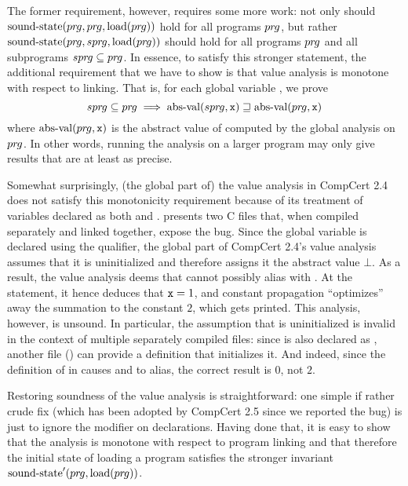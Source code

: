 

The former requirement, however, requires some more work:
not only should \\ $\mathrm{sound\text{-}state}({pr\hspace*{-1pt}g},{pr\hspace*{-1pt}g},\mathrm{load}({pr\hspace*{-1pt}g}))$ hold for all programs ${pr\hspace*{-1pt}g}$,
but rather \\ $\mathrm{sound\text{-}state}({pr\hspace*{-1pt}g},{spr\hspace*{-1pt}g},\mathrm{load}({pr\hspace*{-1pt}g}))$ should hold for all programs ${pr\hspace*{-1pt}g}$ and all subprograms ${spr\hspace*{-1pt}g}\subseteq{pr\hspace*{-1pt}g}$.
In essence, to satisfy this stronger statement, the additional requirement that we have to show is that value analysis is monotone with respect to linking.
That is, for each global variable , we prove
\[
{spr\hspace*{-1pt}g} \subseteq {pr\hspace*{-1pt}g} \implies  \mathrm{abs\text{-}val}({spr\hspace*{-1pt}g},\texttt{x}) \sqsupseteq \mathrm{abs\text{-}val}({pr\hspace*{-1pt}g},\texttt{x})
\]
where $\mathrm{abs\text{-}val}({pr\hspace*{-1pt}g},\texttt{x})$ is the abstract value of  computed by the global analysis on ${pr\hspace*{-1pt}g}$.
In other words, running the analysis on a larger program may only give results that are at least as precise.

Somewhat surprisingly, (the global part of) the value analysis in
CompCert 2.4 does not satisfy this monotonicity requirement because of
its treatment of variables declared as both  and
.   presents two C files that,
when compiled separately and linked together, expose the bug.  Since
the global variable  is declared using the 
qualifier, the global part of CompCert 2.4's value analysis assumes
that it is uninitialized and therefore assigns it the abstract value
$\bot$.  As a result, the value analysis deems that  cannot
possibly alias with .  At the  statement, it
hence deduces that $\texttt{x}=1$, and constant propagation
``optimizes'' away the summation  to the constant $2$, which
gets printed.  This analysis, however, is unsound.  In particular, the
assumption that  is uninitialized is invalid in the context
of multiple separately compiled files: since  is also
declared as , another file () can provide a
definition that initializes it.  And indeed, since the definition of
 in  causes  and  to alias, the
correct result is $0$, not $2$.

Restoring soundness of the value analysis is straightforward: one
simple if rather crude fix (which has been adopted by CompCert 2.5
since we reported the bug) is just to ignore the  modifier
on  declarations.  Having done that, it is easy to show
that the analysis is monotone with respect to program linking and that
therefore the initial state of loading a program satisfies the
stronger invariant $\mathrm{sound\text{-}state}'({pr\hspace*{-1pt}g},\mathrm{load}({pr\hspace*{-1pt}g}))$.


